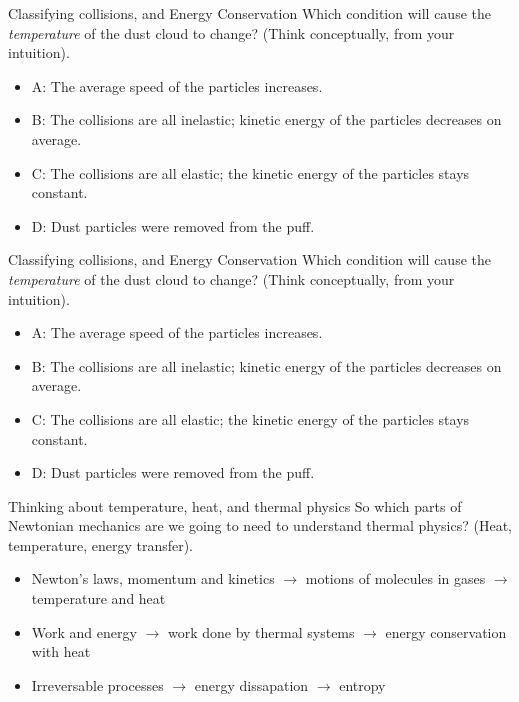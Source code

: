 \documentclass{beamer}
\begin{document}
\begin{frame}{Classifying collisions, and Energy Conservation}
Which condition will cause the \textit{temperature} of the dust cloud to change?  (Think conceptually, from your intuition).
\begin{itemize}
\item A: The average speed of the particles increases.
\item B: The collisions are all inelastic; kinetic energy of the particles decreases on average.
\item C: The collisions are all elastic; the kinetic energy of the particles stays constant.
\item D: Dust particles were removed from the puff.
\end{itemize}
\end{frame}

\begin{frame}{Classifying collisions, and Energy Conservation}
Which condition will cause the \textit{temperature} of the dust cloud to change?  (Think conceptually, from your intuition).
\begin{itemize}
\item A: The average speed of the particles increases.
\item B: The collisions are all inelastic; kinetic energy of the particles decreases on average.
\item C: The collisions are all elastic; the kinetic energy of the particles stays constant.
\item D: Dust particles were removed from the puff.
\end{itemize}
\end{frame}

\begin{frame}{Thinking about temperature, heat, and thermal physics}
So which parts of Newtonian mechanics are we going to need to understand thermal physics? (Heat, temperature, energy transfer).
\begin{itemize}
\item Newton's laws, momentum and kinetics $\rightarrow$ motions of molecules in gases $\rightarrow$ temperature and heat
\item Work and energy $\rightarrow$ work done by thermal systems $\rightarrow$ energy conservation with heat
\item Irreversable processes $\rightarrow$ energy dissapation $\rightarrow$ entropy
\end{itemize}
\end{frame}
\end{document}
